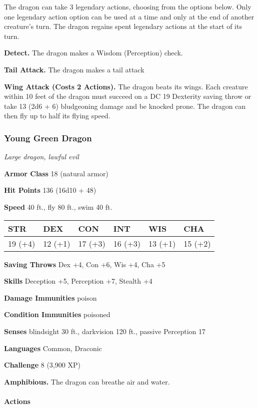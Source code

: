 \documentclass[
]{article}
\begin{document}
The dragon can take 3 legendary actions, choosing from the options
below. Only one legendary action option can be used at a time and only
at the end of another creature's turn. The dragon regains spent
legendary actions at the start of its turn.

\textbf{Detect.} The dragon makes a Wisdom (Perception) check.

\textbf{Tail Attack.} The dragon makes a tail attack

\textbf{Wing Attack (Costs 2 Actions).} The dragon beats its wings. Each
creature within 10 feet of the dragon must succeed on a DC 19 Dexterity
saving throw or take 13 (2d6 + 6) bludgeoning damage and be knocked
prone. The dragon can then fly up to half its flying speed.

\hypertarget{young-green-dragon}{%
\subsubsection{Young Green Dragon}\label{young-green-dragon}}

\emph{Large dragon, lawful evil}

\textbf{Armor Class} 18 (natural armor)

\textbf{Hit Points} 136 (16d10 + 48)

\textbf{Speed} 40 ft., fly 80 ft., swim 40 ft.

\begin{longtable}[]{@{}llllll@{}}
\toprule
STR & DEX & CON & INT & WIS & CHA\tabularnewline
\midrule
\endhead
19 (+4) & 12 (+1) & 17 (+3) & 16 (+3) & 13 (+1) & 15 (+2)\tabularnewline
\bottomrule
\end{longtable}

\textbf{Saving Throws} Dex +4, Con +6, Wis +4, Cha +5

\textbf{Skills} Deception +5, Perception +7, Stealth +4

\textbf{Damage Immunities} poison

\textbf{Condition Immunities} poisoned

\textbf{Senses} blindsight 30 ft., darkvision 120 ft., passive
Perception 17

\textbf{Languages} Common, Draconic

\textbf{Challenge} 8 (3,900 XP)

\textbf{Amphibious.} The dragon can breathe air and water.

\hypertarget{actions-33}{%
\paragraph{Actions}\label{actions-33}}
\end{document}
